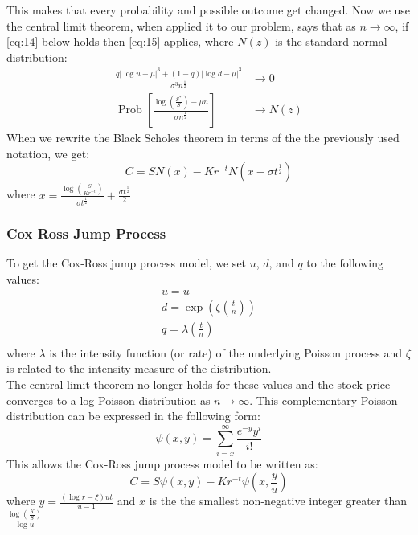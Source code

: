 \documentclass{article}
\DeclareMathOperator{\Prob}{Prob}
\begin{document}
This makes that every probability and possible outcome get changed. Now we use the central limit theorem, when applied it to our problem, says that as $n \rightarrow \infty$, if \ref{eq:14} below holds then \ref{eq:15} applies, where $N(z)$ is the standard normal distribution:
\begin{align} \label{eq:14}
    \frac{q|\log u - \mu|^{3} + (1-q)|\log d - \mu|^{3}}{\sigma^{3}n^{\frac{1}{2}}} & \rightarrow 0 \\
    \Prob\left[\frac{\log\left(\frac{S^{*}}{S}\right) - \mu n}{\sigma n^{\frac{1}{2}}}\right] & \rightarrow N(z) \label{eq:15}
\end{align}
When we rewrite the Black Scholes theorem in terms of the the previously used notation, we get:
\begin{equation}
   C =  S N(x) - K r^{-t} N(x - \sigma t^{\frac{1}{2}})
\end{equation}
where $x = \frac{\log\left(\frac{S}{Kr^{-t}}\right)}{\sigma t^{\frac{1}{2}}} + \frac{\sigma t^{\frac{1}{2}}}{2}$
\subsubsection{Cox Ross Jump Process}
To get the Cox-Ross jump process model, we set $u$, $d$, and $q$ to the following values:
\begin{gather*}
    u = u \\
    d = \exp\left(\zeta \left(\frac{t}{n}\right)\right) \\
    q = \lambda \left(\frac{t}{n}\right) \\
\end{gather*}
where $\lambda$ is the intensity function (or rate) of the underlying Poisson process and $\zeta$ is related to the intensity measure of the distribution.\\
The central limit theorem no longer holds for these values and the stock price converges to a log-Poisson distribution as $n \rightarrow \infty$. This complementary Poisson distribution can be expressed in the following form:
\begin{equation}
    \psi (x,y) = \sum_{i=x}^{\infty} \frac{e^{-y}y^{i}}{i!}
\end{equation}
This allows the Cox-Ross jump process model to be written as:
\begin{equation}
    C = S \psi(x,y) - Kr^{-t} \psi\left(x,\frac{y}{u}\right)
\end{equation}
where $y=\frac{(\log r - \xi) u t }{u-1}$ and $x$ is the the smallest non-negative integer greater than $\frac{\log\left(\frac{K}{S}\right)}{\log u}$
\end{document}
